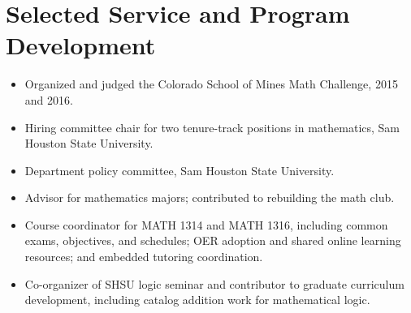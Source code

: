 \documentclass[10pt,letterpaper]{article}
\begin{document}
\section*{Selected Service and Program Development}
\begin{itemize}
\item Organized and judged the Colorado School of Mines Math Challenge, 2015 and 2016.
\item Hiring committee chair for two tenure-track positions in mathematics, Sam Houston State University.
\item Department policy committee, Sam Houston State University.
\item Advisor for mathematics majors; contributed to rebuilding the math club.
\item Course coordinator for MATH 1314 and MATH 1316, including common exams, objectives, and schedules; OER adoption and shared online learning resources; and embedded tutoring coordination.
\item Co-organizer of SHSU logic seminar and contributor to graduate curriculum development, including catalog addition work for mathematical logic.
\end{itemize}
\end{document}
